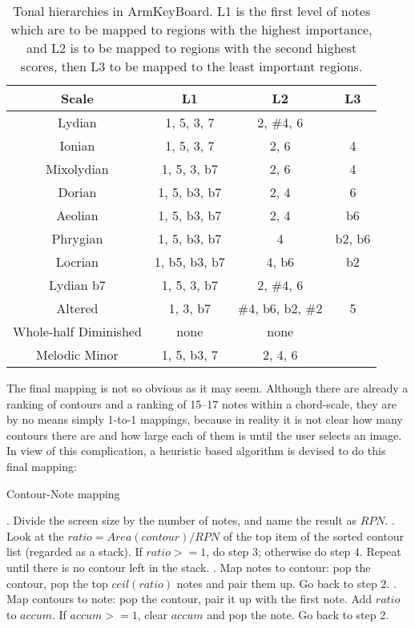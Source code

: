 \begin{table}
\centering
\caption{Tonal hierarchies in ArmKeyBoard. L1 is the first level of notes which are to be mapped to regions with the highest importance, and L2 is to be mapped to regions with the second highest scores, then L3 to be mapped to the least important regions.}
\begin{tabular}{|c|c|c|c|} \hline
Scale & L1 & L2 & L3\\ \hline
Lydian & 1, 5, 3, 7& 2, \#4, 6 & \\ \hline
Ionian & 1, 5, 3, 7& 2, 6 & 4\\ \hline
Mixolydian & 1, 5, 3, b7 & 2, 6 & 4\\ \hline
Dorian & 1, 5, b3, b7& 2, 4 & 6\\ \hline
Aeolian & 1, 5, b3, b7& 2, 4 & b6\\ \hline
Phrygian & 1, 5, b3, b7& 4 & b2, b6\\ \hline
Locrian & 1, b5, b3, b7& 4, b6 & b2\\ \hline
Lydian b7 & 1, 5, 3, b7& 2, \#4, 6 &\\ \hline
Altered & 1, 3, b7& \#4, b6, b2, \#2 & 5\\ \hline
Whole-half Diminished & none & none &\\ \hline
Melodic Minor & 1, 5, b3, 7& 2, 4, 6 &\\ \hline
\end{tabular}
\label{tab:5-tonalhierarchy}
\end{table}

The final mapping is not so obvious as it may seem. Although there are already a ranking of contours and a ranking of 15--17 notes within a chord-scale, they are by no means simply 1-to-1 mappings, because in reality it is not clear how many contours there are and how large each of them is until the user selects an image. In view of this complication, a heuristic based algorithm is devised to do this final mapping:
\begin{algorithm}
\caption{Contour-Note mapping}
\begin{algorithmic}
. Divide the screen size by the number of notes, and name the result as $RPN$.
. Look at the $ ratio = Area(contour) / RPN $ of the top item of the sorted contour list (regarded as a stack). If $ratio>=1$, do step	3; otherwise do step 4. Repeat until there is no contour left in the stack.
. Map notes to contour: pop the contour, pop the top $ ceil(ratio)$ notes and pair them up. Go back to step 2.
. Map contours to note: pop the contour, pair it up with the first	note. Add $ratio$ to $accum$. If $accum>=1$, clear $accum$ and pop the note. Go back to step 2.
\end{algorithmic}
\end{algorithm}


